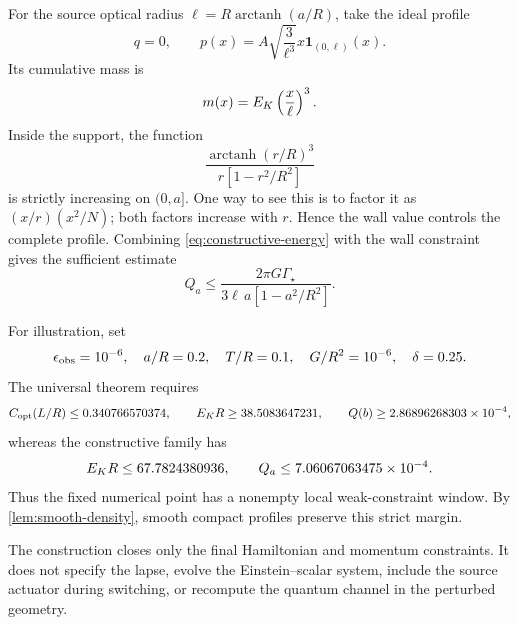 For the source optical radius
$\ell=R\operatorname{arctanh}(a/R)$, take the ideal profile
\begin{equation}
 q=0,
 \qquad
 p(x)=A\sqrt{\frac{3}{\ell^3}}x\mathbf1_{(0,\ell)}(x).
 \label{eq:gravity-profile}
\end{equation}
Its cumulative mass is
\begin{equation}
 m(x)=E_{K}\left(\frac{x}{\ell}\right)^3.
 \label{eq:cumulative-mass}
\end{equation}
Inside the support, the function
\begin{equation}
 \frac{\operatorname{arctanh}(r/R)^3}{r[1-r^2/R^2]}
 \label{eq:q-monotone-function}
\end{equation}
is strictly increasing on $(0,a]$.  One way to see this is to factor it as
$(x/r)(x^2/N)$; both factors increase with $r$.  Hence the wall value controls
the complete profile.  Combining \cref{eq:constructive-energy} with the wall
constraint gives the sufficient estimate
\begin{equation}
 Q_a
 \leq\frac{2\pi G\Gamma_\star}
 {3\ell\,a[1-a^2/R^2]}.
 \label{eq:constructive-gravity}
\end{equation}

For illustration, set
\begin{equation}
 \epsilon_{\mathrm{obs}}=10^{-6},\quad
 a/R=0.2,\quad T/R=0.1,\quad
 G/R^2=10^{-6},\quad \delta=0.25.
\end{equation}
The universal theorem requires
\begin{equation}
 C_{\rm opt}(L/R)\leq0.340766570374,
 \qquad E_{K} R\geq38.5083647231,
 \qquad Q(b)\geq2.86896268303\times10^{-4},
\end{equation}
whereas the constructive family has
\begin{equation}
 E_{K} R\leq67.7824380936,
 \qquad Q_a\leq7.06067063475\times10^{-4}.
\end{equation}
Thus the fixed numerical point has a nonempty local weak-constraint window.  By
\cref{lem:smooth-density}, smooth compact profiles preserve this strict
margin.

The construction closes only the final Hamiltonian and momentum constraints.
It does not specify the lapse, evolve the Einstein--scalar system, include the
source actuator during switching, or recompute the quantum channel in the
perturbed geometry.
